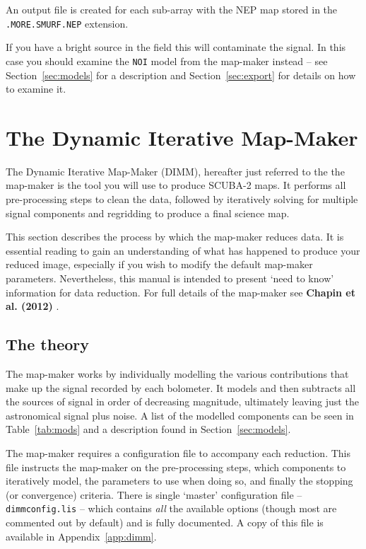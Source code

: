 \documentclass[twoside,11pt]{article}
\newcommand{\htmlref}[2]{#1}
\newcommand{\latexhtml}[2]{#1}
\newcommand{\xlabel}[1]{}
\renewcommand{\_}{\texttt{\symbol{95}}}
\newcommand{\cref}[3]{\latexhtml{#1~\ref{#2}}{\htmlref{#3}{#2}}}
\begin{document}
An output file is created for each sub-array with the NEP map stored
in the \texttt{.MORE.SMURF.NEP} extension.

If you have a bright source in the field this will
contaminate the signal. In this case you should examine the
\texttt{NOI} model from the map-maker instead -- see
\cref{Section}{sec:models}{The Individual Models} for a description
and \cref{Section}{sec:export}{Exporting individual models} for
details on how to examine it.

\clearpage
\section{\xlabel{dimm}The Dynamic Iterative Map-Maker}
\label{sec:dimm}

The Dynamic Iterative Map-Maker (DIMM), hereafter just referred to the
the map-maker is the tool you will use to produce SCUBA-2 maps. It
performs all pre-processing steps to clean the data, followed by
iteratively solving for multiple signal components and regridding to
produce a final science map.

This section describes the process by which the map-maker reduces
data. It is essential reading to gain an understanding of what has
happened to produce your reduced image, especially if you wish to
modify the default map-maker parameters. Nevertheless, this manual
is intended to present `need to know' information for data reduction.
For full details of the map-maker see \textbf{Chapin et al. (2012)} \cite{mapmaker}.

\subsection{\xlabel{dimm_theory}The theory}

The map-maker works by individually modelling the various
contributions that make up the signal recorded by each bolometer. It
models and then subtracts all the sources of signal in order of
decreasing magnitude, ultimately leaving just the astronomical signal
plus noise. A list of the modelled components can be seen in
\cref{Table}{tab:mods}{tabulated} and a description found in
\cref{Section}{sec:models}{The Individual Models}.

The map-maker requires a configuration file to accompany each
reduction. This file instructs the map-maker on the pre-processing
steps, which components to iteratively model, the parameters to use
when doing so, and finally the stopping (or convergence) criteria.
There is single `master' configuration file -- \texttt{dimmconfig.lis}
-- which contains \emph{all} the available options (though most are
commented out by default) and is fully documented. A copy of this file
is available in \cref{Appendix}{app:dimm}{an appendix}.
\end{document}

